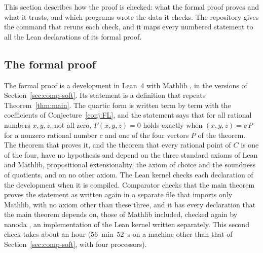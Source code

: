 \documentclass[11pt]{amsart}
\theoremstyle{definition}
\numberwithin{equation}{section}
\newcommand{\computed}[1]{\ignorespaces}
\begin{document}
This section describes how the proof is checked: what the formal proof proves and what it trusts, and which programs wrote the data it checks. The repository gives the command that reruns each check, and it maps every numbered statement to all the Lean declarations of its formal proof.

\subsection{The formal proof}\label{sec:comp-lean}\computed{FurioLombardo/Statement.lean, FurioLombardo/Challenge.lean, config.json, code/formal-proof/comparator_time.sh, code/formal-proof/comparator_time.out, code/formal-proof/comparator_trial_nanoda4.log.gz, code/formal-proof/comment_only_build_sources.sh, code/formal-proof/comment_only_build_sources.out, code/formal-proof/facts.lean, code/formal-proof/main_axioms.lean, code/formal-proof/main_axioms.out, code/formal-proof/native_decide_control.lean, code/formal-proof/native_decide_control.out}
The formal proof \cite{FLQLean} is a development in Lean~4 \cite{Lean4} with Mathlib \cite{Mathlib20}, in the versions of Section~\ref{sec:comp-soft}. Its statement is a definition that repeats Theorem~\ref{thm:main}. The quartic form is written term by term with the coefficients of Conjecture~\ref{conj:FL}, and the statement says that for all rational numbers $x,y,z$, not all zero, $F(x,y,z)=0$ holds exactly when $(x,y,z)=c\,P$ for a nonzero rational number $c$ and one of the four vectors $P$ of the theorem. The theorem that proves it, and the theorem that every rational point of $C$ is one of the four, have no hypothesis and depend on the three standard axioms of Lean and Mathlib, propositional extensionality, the axiom of choice and the soundness of quotients, and on no other axiom. The Lean kernel checks each declaration of the development when it is compiled. Comparator \cite{Comparator} checks that the main theorem proves the statement as written again in a separate file that imports only Mathlib, with no axiom other than these three, and it has every declaration that the main theorem depends on, those of Mathlib included, checked again by nanoda \cite{nanoda}, an implementation of the Lean kernel written separately. This second check takes about an hour ($56$~min~$52$~s on a machine other than that of Section~\ref{sec:comp-soft}, with four processors).
\end{document}
